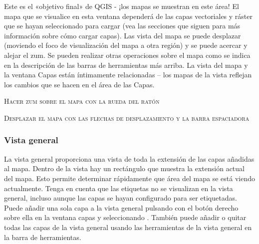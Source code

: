 Este es el «objetivo final» de QGIS - ¡los mapas se muestran en este área! El mapa que se visualice en esta 
ventana dependerá de las capas vectoriales y ráster que se hayan seleccionado para cargar (vea las secciones que siguen 
para más información sobre cómo cargar capas). Las vista del mapa se puede desplazar (moviendo el foco de 
visualización del mapa a otra región) y se puede acercar y alejar el zum. Se pueden realizar otras operaciones 
sobre el mapa como se indica en la descripción de las barras de herramientas más arriba. La vista del mapa y la 
ventana Capas están íntimamente relacionadas – los mapas de la vista reflejan los cambios que se hacen en el área de las Capas. 

\begin{Tip}\caption{\textsc{Hacer zum sobre el mapa con la rueda del ratón}}
\end{Tip}

\begin{Tip}\caption{\textsc{Desplazar el mapa con las flechas de desplazamiento y la barra espaciadora}}
\end{Tip}

\subsubsection{Vista general}\label{label_mapoverview}

La vista general proporciona una vista de toda la extensión de las capas añadidas al mapa. Dentro de la 
vista hay un rectángulo que muestra la extensión actual del mapa. Esto permite determinar rápidamente que área 
del mapa se está viendo actualmente. Tenga en cuenta que las etiquetas no se visualizan en la vista general, 
incluso aunque las capas se hayan configurado para ser etiquetadas. Puede añadir una sola capa a la vista general 
pulsando con el botón derecho sobre ella en la ventana capas y seleccionando . 
También puede añadir o quitar todas las capas de la vista general usando las herramientas de la vista general en 
la barra de herramientas.

